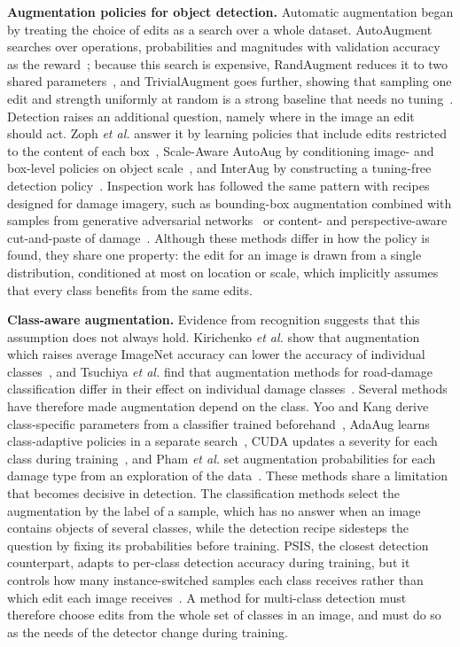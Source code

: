 \noindent\textbf{Augmentation policies for object detection.} Automatic augmentation began by treating the choice of edits as a search over a whole dataset. AutoAugment searches over operations, probabilities and magnitudes with validation accuracy as the reward~\cite{cubuk2019auto}; because this search is expensive, RandAugment reduces it to two shared parameters~\cite{cubuk2020rand}, and TrivialAugment goes further, showing that sampling one edit and strength uniformly at random is a strong baseline that needs no tuning~\cite{muller2021trivial}. Detection raises an additional question, namely where in the image an edit should act. Zoph \emph{et al.} answer it by learning policies that include edits restricted to the content of each box~\cite{zoph2020det}, Scale-Aware AutoAug by conditioning image- and box-level policies on object scale~\cite{chen2021scale}, and InterAug by constructing a tuning-free detection policy~\cite{thopalli2023interaug}. Inspection work has followed the same pattern with recipes designed for damage imagery, such as bounding-box augmentation combined with samples from generative adversarial networks~\cite{aghayan2024} or content- and perspective-aware cut-and-paste of damage~\cite{rdd_cutpaste}. Although these methods differ in how the policy is found, they share one property: the edit for an image is drawn from a single distribution, conditioned at most on location or scale, which implicitly assumes that every class benefits from the same edits.

\noindent\textbf{Class-aware augmentation.} Evidence from recognition suggests that this assumption does not always hold. Kirichenko \emph{et al.} show that augmentation which raises average ImageNet accuracy can lower the accuracy of individual classes~\cite{kirichenko2023}, and Tsuchiya \emph{et al.} find that augmentation methods for road-damage classification differ in their effect on individual damage classes~\cite{tsuchiya2019}. Several methods have therefore made augmentation depend on the class. Yoo and Kang derive class-specific parameters from a classifier trained beforehand~\cite{yoo2023}, AdaAug learns class-adaptive policies in a separate search~\cite{cheung2022adaaug}, CUDA updates a severity for each class during training~\cite{ahn2023cuda}, and Pham \emph{et al.} set augmentation probabilities for each damage type from an exploration of the data~\cite{rdd_detectron2}. These methods share a limitation that becomes decisive in detection. The classification methods select the augmentation by the label of a sample, which has no answer when an image contains objects of several classes, while the detection recipe sidesteps the question by fixing its probabilities before training. PSIS, the closest detection counterpart, adapts to per-class detection accuracy during training, but it controls how many instance-switched samples each class receives rather than which edit each image receives~\cite{wang2019psis}. A method for multi-class detection must therefore choose edits from the whole set of classes in an image, and must do so as the needs of the detector change during training.

